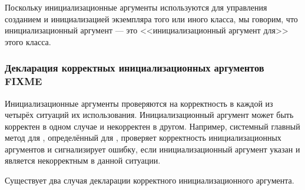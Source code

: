 Поскольку инициализационные аргументы используются для управления созданием и
инициализацией экземпляра того или иного класса, мы говорим, что
инициализационный аргумент --- это <<инициализационный аргумент для>> этого
класса.

\subsubsection{Декларация корректных инициализационных аргументов FIXME}
\label{Declaring-the-Validity-of-Initialization-Arguments-SECTION}

Инициализационные аргументы проверяются на корректность в каждой из четырёх
ситуаций их использования. Инициализационный аргумент может быть корректен в
одном случае и некорректен в другом. Например, системный главный метод для
, определённый для , проверяет
корректность инициализационных аргументов и сигнализирует ошибку, если
инициализационный аргумент указан и является некорректным в данной ситуации.

Существует два случая декларации корректного инициализационного аргумента.

